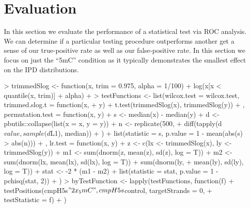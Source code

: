 \documentclass[letterpaper,12pt]{article}
\begin{document}
\section{Evaluation}
In this section we evaluate the performance of a statistical test via
ROC analysis. We can determine if a particular testing procedure
outperforms another get a sense of our true-positive rate as well as
our false-positive rate. In this section we focus on just the ``5mC''
condition as it typically demonstrates the smallest effect on the IPD
distributions.
\begin{Schunk}
\begin{Sinput}
> trimmedSlog <- function(x, trim = 0.975, alpha = 1/100) {
+     log(x[x < quantile(x, trim)] + alpha)
+ }
> testFunctions <- list(wilcox.test = wilcox.test, trimmed.slog.t = function(x, 
+     y) {
+     t.test(trimmedSlog(x), trimmedSlog(y))
+ }, permutation.test = function(x, y) {
+     s <- median(x) - median(y)
+     d <- pbutils::collapse(list(x = x, y = y))
+     n <- replicate(500, {
+         diff(tapply(d$value, sample(d$L1), median))
+     })
+     list(statistic = s, p.value = 1 - mean(abs(s) > abs(n)))
+ }, lr.test = function(x, y) {
+     z <- c(lx <- trimmedSlog(x), ly <- trimmedSlog(y))
+     m1 <- sum(dnorm(z, mean(z), sd(z), log = T))
+     m2 <- sum(dnorm(lx, mean(lx), sd(lx), log = T)) + sum(dnorm(ly, 
+         mean(ly), sd(ly), log = T))
+     stat <- -2 * (m1 - m2)
+     list(statistic = stat, p.value = 1 - pchisq(stat, 2))
+ })
> byTestFunction <- lapply(testFunctions, function(f) {
+     testPositions(cmpH5s$"2x_5mC", cmpH5s$control, targetStrands = 0, 
+         testStatistic = f)
+ })
\end{Sinput}
\end{Schunk}
\end{document}
